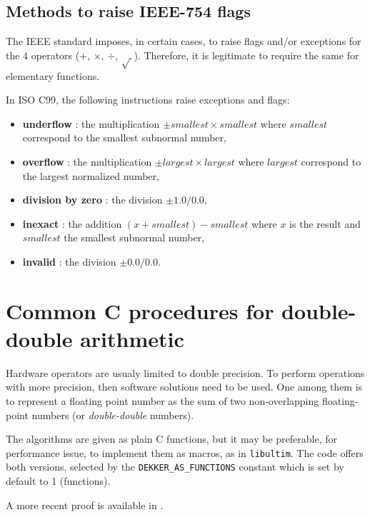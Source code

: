 \subsection{Methods to raise IEEE-754 flags}

The IEEE standard imposes, in certain cases, to raise flags and/or
exceptions for the $4$ operators ($+$, $\times$, $\div$, $\sqrt{~}$).
Therefore, it is legitimate to require the same for elementary
functions.

In ISO C99, the following instructions raise exceptions and
flags:

\begin{itemize}
\item {\bf underflow} : the multiplication $\pm smallest \times smallest$ where $smallest$ correspond to the smallest subnormal number,
\item {\bf overflow} : the multiplication  $\pm largest \times largest$ where $largest$ correspond to the largest normalized number,
\item {\bf division by zero} : the division $\pm 1.0/0.0$,
\item {\bf inexact} : the addition $(x + smallest) - smallest$ where $x$ is the result and  $smallest$ the smallest subnormal number,
\item {\bf invalid} : the division $\pm 0.0/0.0$.
\end{itemize}








\section{Common C procedures for double-double arithmetic\label{section:commonCdoubledouble}}
Hardware operators are usualy limited to double precision. To perform
operations with more precision, then software solutions need to be
used. One among them is to represent a floating point number as the
sum of two non-overlapping floating-point numbers (or
\emph{double-double} numbers). 

The algorithms are given as plain C functions, but it may be
preferable, for performance issue, to implement them as macros, as in
\texttt{libultim}.  The code offers both versions,
selected by the \texttt{DEKKER\_AS\_FUNCTIONS} constant which is set
by default to 1 (functions).

A more recent proof is available in \cite{Lauter2005LIP:tripledouble}.

